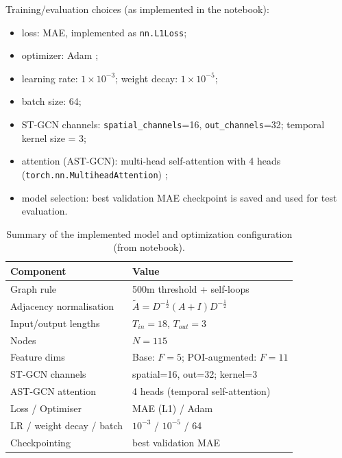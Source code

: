 \documentclass[11pt]{report}
\begin{document}
Training/evaluation choices (as implemented in the notebook):
\begin{itemize}
    \item loss: MAE, implemented as \texttt{nn.L1Loss};
    \item optimizer: Adam \cite{kingma2015adam};
    \item learning rate: $1\times 10^{-3}$; weight decay: $1\times 10^{-5}$;
    \item batch size: 64;
    \item ST-GCN channels: \texttt{spatial\_channels}=16, \texttt{out\_channels}=32; temporal kernel size = 3;
    \item attention (AST-GCN): multi-head self-attention with 4 heads (\texttt{torch.nn.MultiheadAttention}) \cite{vaswani2017attention,pytorch_mha};
    \item model selection: best validation MAE checkpoint is saved and used for test evaluation.
\end{itemize}

\begin{table}[!htbp]
\centering
\small
\caption{Summary of the implemented model and optimization configuration (from notebook).}
\label{tab:app_model_config}
\renewcommand{\arraystretch}{1.15}
\begin{tabular}{ll}
\hline
\textbf{Component} & \textbf{Value} \\
\hline
Graph rule & 500m threshold + self-loops \\
Adjacency normalisation & $\tilde{A}=D^{-\frac12}(A+I)D^{-\frac12}$ \\
Input/output lengths & $T_{in}=18$, $T_{out}=3$ \\
Nodes & $N=115$ \\
Feature dims & Base: $F=5$; POI-augmented: $F=11$ \\
ST-GCN channels & spatial=16, out=32; kernel=3 \\
AST-GCN attention & 4 heads (temporal self-attention) \\
Loss / Optimiser & MAE (L1) / Adam \\
LR / weight decay / batch & $10^{-3}$ / $10^{-5}$ / 64 \\
Checkpointing & best validation MAE \\
\hline
\end{tabular}
\end{table}


\end{document}
